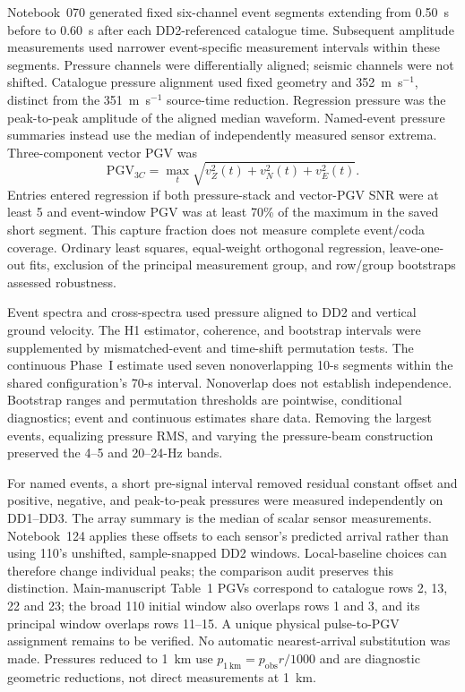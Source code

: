 \documentclass[]{seismica}
\begin{document}
Notebook~070 generated fixed six-channel event segments extending from 0.50~s
before to 0.60~s after each DD2-referenced catalogue time. Subsequent amplitude
measurements used narrower event-specific measurement intervals within these
segments. Pressure channels were differentially aligned; seismic
channels were not shifted. Catalogue pressure alignment used fixed geometry
and 352~m~s$^{-1}$, distinct from the 351~m~s$^{-1}$ source-time reduction.
Regression pressure was the peak-to-peak amplitude
of the aligned median waveform. Named-event pressure summaries instead use
the median of independently measured sensor extrema.
Three-component vector PGV was
\begin{equation}
 \mathrm{PGV}_{3C}=\max_t\sqrt{v_Z^2(t)+v_N^2(t)+v_E^2(t)}.
\end{equation}
Entries entered regression if both pressure-stack and vector-PGV SNR were at
least 5 and event-window PGV was at least 70\% of the maximum in the saved
short segment. This capture fraction does not measure complete event/coda
coverage. Ordinary least squares,
equal-weight orthogonal regression, leave-one-out fits, exclusion of the
principal measurement group, and row/group bootstraps assessed robustness.

Event spectra and cross-spectra used pressure aligned to DD2 and vertical
ground velocity. The H1 estimator, coherence, and bootstrap intervals were
supplemented by mismatched-event and time-shift permutation tests. The
continuous Phase~I estimate used seven nonoverlapping 10-s segments within
the shared configuration's 70-s interval. Nonoverlap does not establish
independence. Bootstrap ranges and permutation thresholds are pointwise,
conditional diagnostics; event and continuous estimates share data. Removing the
largest events, equalizing pressure RMS, and varying the pressure-beam
construction preserved the 4--5 and 20--24-Hz bands.

For named events, a short pre-signal interval removed residual constant offset
and positive, negative, and peak-to-peak pressures were measured independently
on DD1--DD3. The array summary is the median of scalar sensor measurements.
Notebook~124 applies these offsets to each sensor's predicted arrival rather
than using 110's unshifted, sample-snapped DD2 windows. Local-baseline choices
can therefore change individual peaks; the comparison audit preserves this
distinction. Main-manuscript Table~1 PGVs correspond to catalogue rows 2, 13, 22 and 23;
the broad 110 initial window also overlaps rows 1 and 3, and its principal
window overlaps rows 11--15. A unique physical pulse-to-PGV assignment remains
to be verified. No automatic nearest-arrival substitution was made.
Pressures reduced to 1~km use $p_{1\,\mathrm{km}}=p_{\mathrm{obs}}r/1000$ and
are diagnostic geometric reductions, not direct measurements at 1~km.
\end{document}
